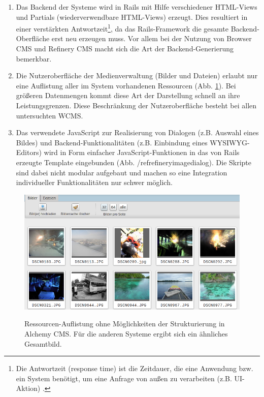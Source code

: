 \begin{enumerate}
\item
Das Backend der Systeme wird in Rails mit Hilfe verschiedener HTML-Views und Partials (wiederverwendbare HTML-Views) erzeugt. Dies resultiert in einer verstärkten Antwortzeit\footnote{Die Antwortzeit (response time) ist die Zeitdauer, die eine Anwendung bzw. ein System benötigt, um eine Anfrage von außen zu verarbeiten (z.B. UI-Aktion) \citep[S. 21] {FowlerPatterns}.}, da das Rails-Framework die gesamte Backend-Oberfläche erst neu erzeugen muss. Vor allem bei der Nutzung von Browser CMS und Refinery CMS macht sich die Art der Backend-Generierung bemerkbar.
\item
Die Nutzeroberfläche der Medienverwaltung (Bilder und Dateien) erlaubt nur eine Auflistung aller im System vorhandenen Ressourcen (Abb. \ref{medeinverwaltungliste}). Bei größeren Datenmengen kommt diese Art der Darstellung schnell an ihre Leistungsgrenzen. Diese Beschränkung der Nutzeroberfläche besteht bei allen untersuchten WCMS.
\item
Das verwendete JavaScript zur Realisierung von Dialogen (z.B. Auswahl eines Bildes) und Backend-Funktionalitäten (z.B. Einbindung eines WYSIWYG-Editors) wird in Form einfacher JavaScript-Funktionen in das von Rails erzeugte Template eingebunden (Abb. /ref{refineryimagedialog}). Die Skripte sind dabei nicht modular aufgebaut und machen so eine Integration individueller Funktionalitäten nur schwer möglich.
\end{enumerate}

\begin{figure}[!H]
\begin{center}
\label{medeinverwaltungliste}
\includegraphics[scale=0.5]{images/analyse/alchemy/ressourcen.png}
\caption{Ressourcen-Auflistung ohne Möglichkeiten der Strukturierung in Alchemy CMS. Für die anderen Systeme ergibt sich ein ähnliches Gesamtbild.}
\end{center}
\end{figure}

